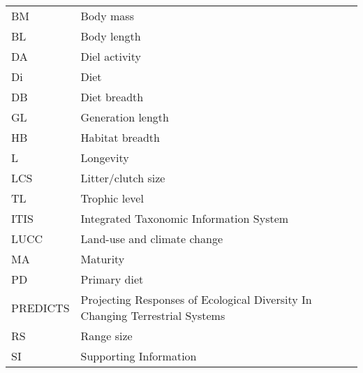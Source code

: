 \begin{tabular}{ll}
BM & Body mass\\
BL & Body length\\
DA & Diel activity\\
Di & Diet\\
DB & Diet breadth\\
GL & Generation length\\
HB & Habitat breadth\\
L & Longevity\\
LCS & Litter/clutch size\\
TL & Trophic level\\
ITIS & Integrated Taxonomic Information System\\
LUCC & Land-use and climate change\\
MA & Maturity\\
PD & Primary diet\\
PREDICTS & Projecting Responses of Ecological Diversity In Changing Terrestrial Systems\\
RS & Range size\\
SI & Supporting Information

\end{tabular}